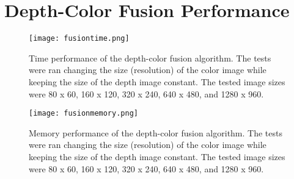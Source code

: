 \chapter{Depth-Color Fusion Performance}

\begin{figure}[htbp]
\begin{center}
\texttt{[image: fusiontime.png]}
\caption[Time performance of the depth-color fusion algorithm]{Time performance of the depth-color fusion 
algorithm. The tests were ran changing the size (resolution) of the color image while keeping the size of the 
depth image constant. The tested image sizes were 80 x 60, 160 x 120, 320 x 240, 640 x 480, and 
1280 x 960.}
\end{center}
\end{figure}

\begin{figure}[htbp]
\begin{center}
\texttt{[image: fusionmemory.png]}
\caption[Memory performance of the depth-color fusion algorithm]{Memory performance of the depth-color 
fusion algorithm. The tests were ran changing the size (resolution) of the color image while keeping the size of 
the depth image constant. The tested image sizes were 80 x 60, 160 x 120, 320 x 240, 640 x 480, and 
1280 x 960.}
\end{center}
\end{figure}
